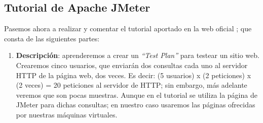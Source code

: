 	\subsection{Tutorial de Apache JMeter}
	Pasemos ahora a realizar y comentar el tutorial aportado en la web oficial \cite{ab-tutorial}; que consta de las siguientes partes:
	\begin{enumerate}
		\item \textbf{Descripción}: aprenderemos a crear un \emph{``Test Plan''} para testear un sitio web. Crearemos cinco usuarios, que enviarán dos consultas cada uno al servidor HTTP de la página web, dos veces. Es decir: (5 usuarios) x (2 peticiones) x (2 veces) = 20 peticiones al servidor de HTTP; sin embargo, más adelante veremos que son pocas muestras. Aunque en el tutorial se utiliza la página de JMeter para dichas consultas; en nuestro caso usaremos las páginas ofrecidas por nuestras máquinas virtuales. 
		

\end{enumerate}
